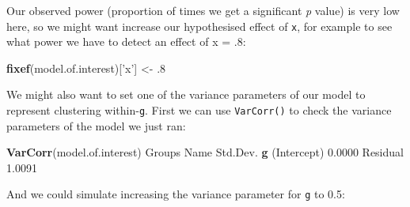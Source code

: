 \documentclass[]{article}
\newenvironment{Shaded}{\begin{snugshade}}{\end{snugshade}}
\newcommand{\ControlFlowTok}[1]{\textcolor[rgb]{0.13,0.29,0.53}{\textbf{#1}}}
\newcommand{\DecValTok}[1]{\textcolor[rgb]{0.00,0.00,0.81}{#1}}
\newcommand{\FloatTok}[1]{\textcolor[rgb]{0.00,0.00,0.81}{#1}}
\newcommand{\KeywordTok}[1]{\textcolor[rgb]{0.13,0.29,0.53}{\textbf{#1}}}
\newcommand{\NormalTok}[1]{#1}
\newcommand{\OperatorTok}[1]{\textcolor[rgb]{0.81,0.36,0.00}{\textbf{#1}}}
\newcommand{\StringTok}[1]{\textcolor[rgb]{0.31,0.60,0.02}{#1}}
\begin{document}
Our observed power (proportion of times we get a significant \emph{p} value) is very
low here, so we might want increase our hypothesised effect of \texttt{x}, for example
to see what power we have to detect an effect of x = .8:

\begin{Shaded}
\begin{Highlighting}[]
\KeywordTok{fixef}\NormalTok{(model.of.interest)[}\StringTok{'x'}\NormalTok{] <-}\StringTok{ }\FloatTok{.8}
\end{Highlighting}
\end{Shaded}

\begin{Shaded}
\end{Shaded}

We might also want to set one of the variance parameters of our model to
represent clustering within-\texttt{g}. First we can use \texttt{VarCorr()} to check the
variance parameters of the model we just ran:

\begin{Shaded}
\begin{Highlighting}[]
\KeywordTok{VarCorr}\NormalTok{(model.of.interest)}
\NormalTok{ Groups   Name        Std.Dev.}
 \KeywordTok{g}\NormalTok{        (Intercept) }\FloatTok{0.0000}  
\NormalTok{ Residual             }\FloatTok{1.0091}  
\end{Highlighting}
\end{Shaded}

And we could simulate increasing the variance parameter for \texttt{g} to 0.5:
\end{document}
